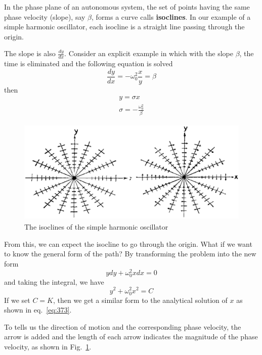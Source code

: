 In the phase plane of an autonomous system, the set of points having
the same phase velocity (slope), say $\beta$, forms a curve calls
{\bf isoclines}. In our example of a simple harmonic oscillator, each
isocline is a straight line passing through the origin.

The slope is also $\frac{dy}{dx}$. Consider an explicit example in
which with the slope $\beta$, the time is eliminated and the following
equation is solved
\begin{equation}
  \label{eq:369}
  \frac{dy}{dx} = -\omega_0^2\frac{x}{y}  = \beta
\end{equation}
then
\begin{eqnarray*}
  y=\sigma x \\
  \sigma= -\frac{\omega_0^2}{\beta}
\end{eqnarray*}

\begin{figure}[hbt]
  \centerline{\includegraphics[height=5cm]{./images/isoclines.eps}}
  \caption{The isoclines of the simple harmonic oscillator}
  \label{fig:isocline_sho}
\end{figure}

From this, we can expect the isocline to go through the origin.  What
if we want to know the general form of the path?  By transforming the
problem into the new form
\begin{equation}
  \label{eq:374}
  ydy + \omega_0^2xdx = 0
\end{equation}
and taking the integral, we have
\begin{equation}
  \label{eq:375}
  y^2 + \omega_0^2x^2 = C
\end{equation}
If we set $C=K$, then we get a similar form to the analytical solution
of $x$ as shown in eq.~\eqref{eq:373}.

To tells us the direction of motion and the corresponding phase
velocity, the arrow is added and the length of each arrow indicates
the magnitude of the phase velocity, as shown in
Fig.~\ref{fig:isocline_sho}.




